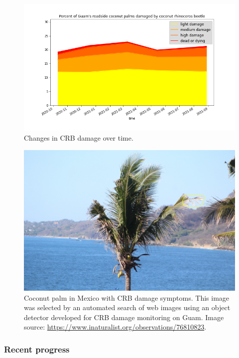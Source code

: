 \documentclass[12pt,letterpaper,english,bibliography=totocnumbered, abstract=on]{scrartcl}
\begin{document}
\begin{figure}[H]
	\centering
	\includegraphics[width=\linewidth]{../images/timeline-2021-08}
	\caption{Changes in CRB damage over time.}
	\label{fig:timeline-2021-08}
\end{figure}

\begin{figure}[H]
	\centering
	\includegraphics[width=\linewidth]{../images/crb-mexico}
	\caption{Coconut palm in Mexico with CRB damage symptoms. This image was selected by an automated search of web images using an object detector developed for CRB damage monitoring on Guam. Image source: \url{https://www.inaturalist.org/observations/76810823}.}
	\label{fig:crb-mexico}
\end{figure}


\subsubsection{Recent progress}
\end{document}

